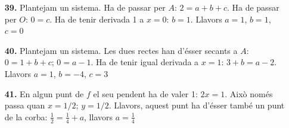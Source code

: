 \documentclass[a4paper, pdf, twoside]{book}
\begin{document}
\begin{enumerate}
\vspace{0.25cm}
\item[\fontfamily{phv}\selectfont\color{blue}\textbf{39. }] 
Plantejam un sistema. Ha de passar per $A$: $2=a+b+c$. Ha de passar per $O$: $0=c$. Ha de tenir derivada 1 a $x=0$: $b=1$. Llavors $a=1$, $b=1$, $c=0$
\vspace{0.25cm}
\item[\fontfamily{phv}\selectfont\color{blue}\textbf{40. }] 
Plantejam un sistema. Les dues rectes han d'ésser secants a $A$: $0=1+b+c$; $0=a-1$. Ha de tenir igual derivada a $x=1$: $3+b=a-2$. Llavors $a=1$, $b=-4$, $c=3$
\vspace{0.25cm}
\item[\fontfamily{phv}\selectfont\color{blue}\textbf{41. }] 
En algun punt de $f$ el seu pendent ha de valer 1: $2x=1$. Això només passa quan $x=1/2$; $y=1/2$. Llavors, aquest punt ha d'ésser també un punt de la corba: $\frac {1}{2}=\frac {1}{4}+a$, llavors $a=\frac {1}{4}$ 
 \end{enumerate}
\vspace{0.3cm}

\end{document}
